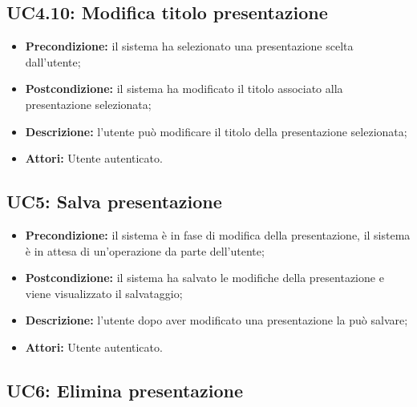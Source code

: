 \subsection{ UC4.10: Modifica titolo presentazione}

\begin{itemize}
	\item \textbf{Precondizione:} il sistema ha selezionato una presentazione scelta dall'utente;
	\item \textbf{Postcondizione:} il sistema ha modificato il titolo associato alla presentazione selezionata;
	\item \textbf{Descrizione:} l'utente può modificare il titolo della presentazione selezionata;
	\item \textbf{Attori:} Utente autenticato.
\end{itemize}
\subsection{ UC5: Salva presentazione}

\begin{itemize}
	\item \textbf{Precondizione:} il sistema è in fase di modifica della presentazione, il sistema è in attesa di un'operazione da parte dell'utente;
	\item \textbf{Postcondizione:} il sistema ha salvato le modifiche della presentazione e viene visualizzato il salvataggio;
	\item \textbf{Descrizione:} l'utente dopo aver modificato una presentazione la può salvare;
	\item \textbf{Attori:} Utente autenticato.
\end{itemize}
\subsection{ UC6: Elimina presentazione}

